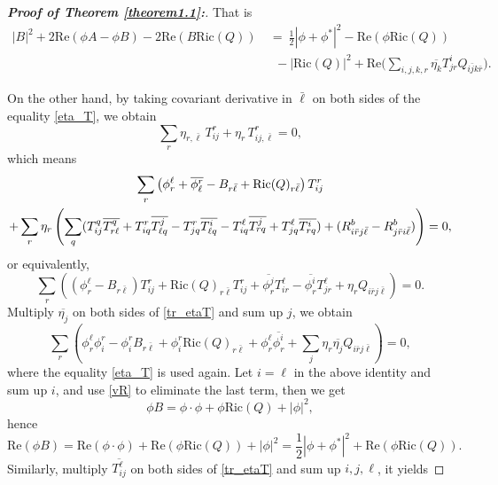 \documentclass{amsart}
\numberwithin{equation}{section}
\theoremstyle{definition}
\renewcommand{\1}{\mathds{1}}
\renewcommand{\>}{\rightarrow}
\begin{document}
\begin{proof}[{\bf Proof of Theorem \ref{theorem1.1}:}]
That is
\begin{equation}\label{eq_1}
\begin{aligned}
|B|^2  + 2 \mathrm{Re}(\phi A - \phi B ) - 2 \mathrm{Re}(B\mathrm{Ric}(Q)) & \ = \
\frac{1}{2}|\phi+\phi^*|^2 -  \mathrm{Re}(\phi \mathrm{Ric}(Q))\\
& \ \ \ - |\mathrm{Ric}(Q)|^2 +  \mathrm{Re} \big(\sum_{i,j,k,r} \overline{\eta_k} T^i_{jr} Q_{i\bar{j}k\bar{r}}\big).
\end{aligned}
\end{equation}

On the other hand, by taking covariant derivative in $\bar{\ell}$
on both sides of the equality \eqref{eta_T}, we obtain
\[\sum_r \eta_{r,\bar{\ell}}\,T^r_{ij} + \eta_r\,T^r_{ij,\bar{\ell}} =0,\]
which means
\begin{gather}
\sum_r\left(\phi_r^{\ell} + \overline{\phi_{\ell}^r} - B_{r \bar{\ell}} + \mathrm{Ric}(Q)_{r\bar{\ell}} \right)T^r_{ij} \notag\\
+ \sum_r \eta_r \left(\sum_q (T^q_{ij}\overline{T^q_{r \ell}} + T^r_{iq} \overline{T^j_{\ell q}}
- T^r_{jq}\overline{T^i_{\ell q}} - T^\ell_{iq} \overline{T^j_{rq}} + T^\ell_{jq}\overline{T^i_{rq}})
+  ( R^b_{i\bar{r}j\bar{\ell}} - R^b_{j \bar{r} i \bar{\ell}} )\right)=0 , \notag
\end{gather}
or equivalently,
\begin{equation}\label{tr_etaT}
\sum_r\left((\phi_r^{\ell}-B_{r\bar{\ell}})T^r_{ij} +  \mathrm{Ric}(Q)_{r\bar{\ell}} T^r_{ij}
+  \overline{\phi^j_r}T^{\ell}_{ir} - \overline{\phi^i_r}T^{\ell}_{jr} +\eta_r Q_{i\bar{r}j\bar{\ell}}\right)=0.
\end{equation}
Multiply $\overline{\eta_j}$ on both sides of \eqref{tr_etaT} and sum up $j$, we obtain
\[ \sum_{r} \left(\phi_r^{\ell}\phi_i^{r} - \phi^r_i B_{r\bar{\ell}}
+  \phi^r_i \mathrm{Ric}(Q)_{r\bar{\ell}} +  \phi^{\ell}_{r}\overline{\phi^i_r}
+ \sum_j \eta_r \overline{\eta_j} Q_{i\bar{r}j\bar{\ell}}\right) =0,\]
where the equality \eqref{eta_T} is used again.
Let $i=\ell$ in the above identity and sum up $i$, and use \eqref{vR} to eliminate the last term, then we get
\[ \phi B = \phi \cdot \phi +  \phi \mathrm{Ric}(Q) + |\phi|^2,\]
hence
\begin{equation}\label{eq_2}
\mathrm{Re}(\phi B) = \mathrm{Re}(\phi \cdot \phi) +  \mathrm{Re}(\phi \mathrm{Ric}(Q)) + |\phi|^2
=\frac{1}{2}|\phi+\phi^*|^2 +  \mathrm{Re}(\phi \mathrm{Ric}(Q)).
\end{equation}
Similarly, multiply $\overline{T^{\ell}_{ij}}$ on both sides of \eqref{tr_etaT} and sum up $i,j,\ell$, it yields

\end{proof}
\end{document}
